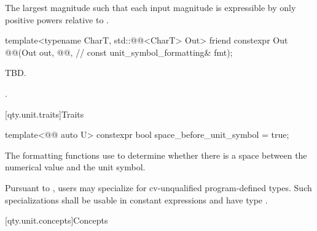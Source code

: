 \begin{itemdescr}
\pnum
\returns
The largest magnitude 
such that each input magnitude is expressible
by only positive powers relative to .
\end{itemdescr}

\begin{itemdecl}
template<typename CharT, std::@@<CharT> Out>
friend constexpr Out @@(Out out, @@,                   // \expos
                                      const unit_symbol_formatting& fmt);
\end{itemdecl}

\begin{itemdescr}
\pnum
\effects
TBD.

\pnum
\returns
{}.
\end{itemdescr}

[qty.unit.traits]{Traits}

\begin{itemdecl}
template<@@ auto U>
constexpr bool space_before_unit_symbol = true;
\end{itemdecl}

\begin{itemdescr}
\pnum
The formatting functions use 
to determine whether there is a space
between the numerical value and the unit symbol.

\pnum
\remarks
Pursuant to ,
users may specialize 
for cv-unqualified program-defined types.
Such specializations shall be usable in constant expressions
and have type .
\end{itemdescr}

[qty.unit.concepts]{Concepts}

